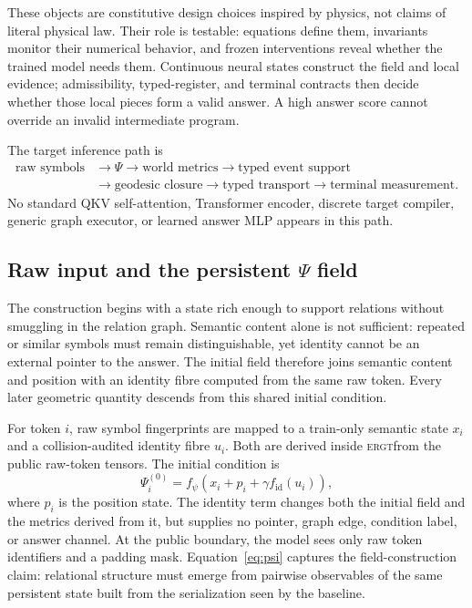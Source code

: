 \documentclass[11pt]{article}
\newcommand{\ERGT}{\textsc{ergt}}
\begin{document}
These objects are constitutive design choices inspired by physics, not claims
of literal physical law. Their role is testable: equations define them,
invariants monitor their numerical behavior, and frozen interventions reveal
whether the trained model needs them. Continuous neural states construct the
field and local evidence; admissibility, typed-register, and terminal contracts
then decide whether those local pieces form a valid answer. A high answer score
cannot override an invalid intermediate program.

The target inference path is
\[
\begin{aligned}
\text{raw symbols}&\rightarrow\Psi\rightarrow\text{world metrics}
\rightarrow\text{typed event support}\\
&\rightarrow\text{geodesic closure}\rightarrow\text{typed transport}
\rightarrow\text{terminal measurement}.
\end{aligned}
\]
No standard QKV self-attention, Transformer encoder, discrete target compiler,
generic graph executor, or learned answer MLP appears in this path.

\subsection{Raw input and the persistent \texorpdfstring{$\Psi$}{Psi} field}

The construction begins with a state rich enough to support relations without
smuggling in the relation graph. Semantic content alone is not sufficient:
repeated or similar symbols must remain distinguishable, yet identity cannot be
an external pointer to the answer. The initial field therefore joins semantic
content and position with an identity fibre computed from the same raw token.
Every later geometric quantity descends from this shared initial condition.

For token $i$, raw symbol fingerprints are mapped to a train-only semantic
state $x_i$ and a collision-audited identity fibre $u_i$. Both are derived
inside \ERGT from the public raw-token tensors. The initial condition is
\begin{equation}
\Psi_i^{(0)} = f_\psi\!\left(x_i+p_i+\gamma f_{\mathrm{id}}(u_i)\right),
\label{eq:psi}
\end{equation}
where $p_i$ is the position state. The identity term changes both the initial
field and the metrics derived from it, but supplies no pointer, graph edge,
condition label, or answer channel. At the public boundary, the model sees only
raw token identifiers and a padding mask. Equation~\ref{eq:psi} captures the
field-construction claim: relational structure must emerge from pairwise
observables of the same persistent state built from the serialization seen by
the baseline.
\end{document}
